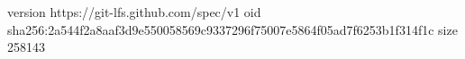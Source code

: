 version https://git-lfs.github.com/spec/v1
oid sha256:2a544f2a8aaf3d9e550058569c9337296f75007e5864f05ad7f6253b1f314f1c
size 258143
